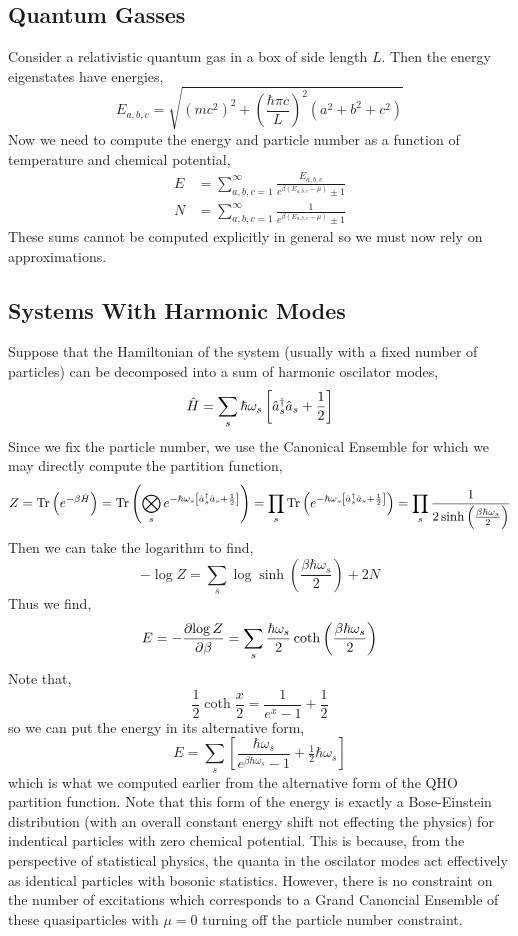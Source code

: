 \documentclass[12pt]{article}
\begin{document}
\subsection{Quantum Gasses}

Consider a relativistic quantum gas in a box of side length $L$. Then the energy eigenstates have energies,
\[ E_{a,b,c} = \sqrt{(m c^2)^2 + \left( \frac{\hbar \pi c}{L} \right)^2 (a^2 + b^2 + c^2)} \]
Now we need to compute the energy and particle number as a function of temperature and chemical potential,
\begin{align*}
E & = \sum_{a,b,c = 1}^\infty \frac{E_{a,b,c}}{e^{\beta (E_{a,b,c} - \mu)} \pm 1}
\\ 
N & = \sum_{a,b,c = 1}^\infty \frac{1}{e^{\beta (E_{a,b,c} - \mu)} \pm 1}
\end{align*}
These sums cannot be computed explicitly in general so we must now rely on approximations. 

\subsection{Systems With Harmonic Modes}

Suppose that the Hamiltonian of the system (usually with a fixed number of particles) can be decomposed into a sum of harmonic oscilator modes,
\[ \hat{H} = \sum_{s} \hbar \omega_s \left[ \hat{a}^\dagger_s \hat{a}_s + \frac{1}{2} \right] \]
Since we fix the particle number, we use the Canonical Ensemble for which we may directly compute the partition function,
\begin{align*}
Z = \mathrm{Tr} \left( e^{-\beta \hat{H}} \right) = \mathrm{Tr} \left( \bigotimes_{s} e^{-\hbar \omega_s \left[ \hat{a}^\dagger_s \hat{a}_s + \frac{1}{2} \right]} \right) = \prod_{s} \mathrm{Tr} \left( e^{-\hbar \omega_s \left[ \hat{a}^\dagger_s \hat{a}_s + \frac{1}{2} \right]} \right) = \prod_s \frac{1}{2 \sinh{\left(\frac{\beta \hbar \omega_s}{2} \right)}} 
\end{align*}
Then we can take the logarithm to find,
\[ -\log{Z} = \sum_{s} \log{\sinh{\left(\frac{\beta \hbar \omega_s}{2} \right)}} + 2 N \] 
Thus we find,
\[ E = - \frac{\partial{\log{Z}}}{\partial{\beta}} = \sum_s \frac{\hbar \omega_s}{2} \coth{\left(\frac{\beta \hbar \omega_s}{2} \right)} \]
Note that,
\[ \frac{1}{2} \coth{\frac{x}{2}} = \frac{1}{e^x - 1} + \frac{1}{2} \]
so we can put the energy in its alternative form,
\[ E = \sum_s \left[ \frac{\hbar \omega_s}{e^{\beta \hbar \omega_s} - 1} + \tfrac{1}{2} \hbar \omega_s \right] \]
which is what we computed earlier from the alternative form of the QHO partition function. Note that this form of the energy is exactly a Bose-Einstein distribution (with an overall constant energy shift not effecting the physics) for indentical particles with zero chemical potential. This is because, from the perspective of statistical physics, the quanta in the oscilator modes act effectively as identical particles with bosonic statistics. However, there is no constraint on the number of excitations which corresponds to a Grand Canoncial Ensemble of these quasiparticles with $\mu = 0$ turning off the particle number constraint. 
\end{document}
